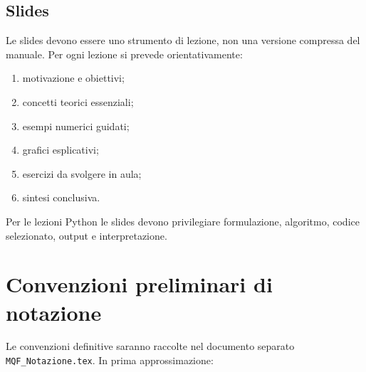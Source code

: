 \documentclass[12pt,a4paper]{article}%
\begin{document}
\subsection{Slides}

Le slides devono essere uno strumento di lezione, non una versione compressa
del manuale. Per ogni lezione si prevede orientativamente:

\begin{enumerate}
\item motivazione e obiettivi;

\item concetti teorici essenziali;

\item esempi numerici guidati;

\item grafici esplicativi;

\item esercizi da svolgere in aula;

\item sintesi conclusiva.
\end{enumerate}

Per le lezioni Python le slides devono privilegiare formulazione, algoritmo,
codice selezionato, output e interpretazione.

\section{Convenzioni preliminari di notazione}

Le convenzioni definitive saranno raccolte nel documento separato
\texttt{MQF\_Notazione.tex}. In prima approssimazione:
\end{document}
